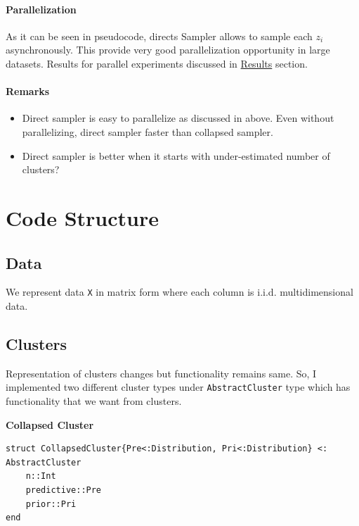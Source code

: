 \documentclass[a4paper]{article}
\begin{document}
\paragraph{Parallelization}

As it can be seen in pseudocode, directs Sampler allows to sample each
\(z_i\) asynchronously. This provide very good parallelization
opportunity in large datasets. Results for parallel experiments
discussed in \protect\hyperlink{ux20Results}{Results} section.


\paragraph{Remarks}

\begin{itemize}
\item
  Direct sampler is easy to parallelize as discussed in above. Even
  without parallelizing, direct sampler faster than collapsed sampler.
\item
  Direct sampler is better when it starts with under-estimated number of
  clusters?
\end{itemize}


\section{Code Structure}


\subsection{Data}

We represent data \texttt{X} in matrix form where each column is i.i.d.
multidimensional data.


\subsection{Clusters}

Representation of clusters changes but functionality remains same. So, I
implemented two different cluster types under \texttt{AbstractCluster}
type which has functionality that we want from clusters.

\textbf{Collapsed Cluster}

\begin{lstlisting}
struct CollapsedCluster{Pre<:Distribution, Pri<:Distribution} <: AbstractCluster
    n::Int
    predictive::Pre
    prior::Pri
end
\end{lstlisting}
\end{document}
